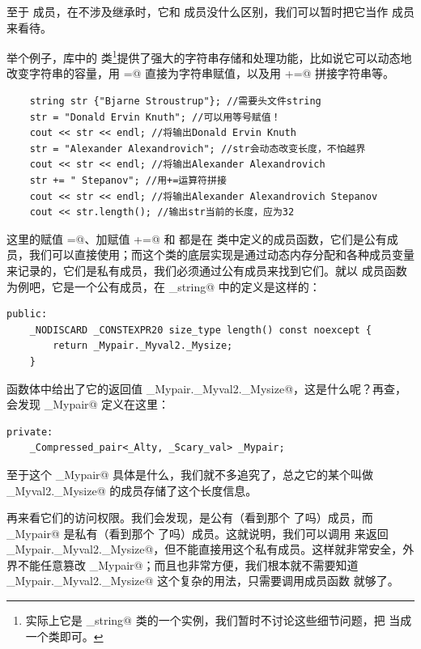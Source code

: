 至于 \lstinline@protected@ 成员，在不涉及继承时，它和 \lstinline@private@ 成员没什么区别，我们可以暂时把它当作 \lstinline@private@ 成员来看待。\par
举个例子，\lstinline@string@ 库中的 \lstinline@string@ 类\footnote{实际上它是 \lstinline@basic_string@ 类的一个实例，我们暂时不讨论这些细节问题，把 \lstinline@string@ 当成一个类即可。}提供了强大的字符串存储和处理功能，比如说它可以动态地改变字符串的容量，用 \lstinline@=@ 直接为字符串赋值，以及用 \lstinline@+=@ 拼接字符串等。
\begin{lstlisting}
    string str {"Bjarne Stroustrup"}; //需要头文件string
    str = "Donald Ervin Knuth"; //可以用等号赋值！
    cout << str << endl; //将输出Donald Ervin Knuth
    str = "Alexander Alexandrovich"; //str会动态改变长度，不怕越界
    cout << str << endl; //将输出Alexander Alexandrovich
    str += " Stepanov"; //用+=运算符拼接
    cout << str << endl; //将输出Alexander Alexandrovich Stepanov
    cout << str.length(); //输出str当前的长度，应为32
\end{lstlisting}\par
这里的赋值 \lstinline@=@、加赋值 \lstinline@+=@ 和 \lstinline@length@ 都是在 \lstinline@string@ 类中定义的成员函数，它们是公有成员，我们可以直接使用；而这个类的底层实现是通过动态内存分配和各种成员变量来记录的，它们是私有成员，我们必须通过公有成员来找到它们。就以 \lstinline@length@ 成员函数为例吧，它是一个公有成员，在 \lstinline@basic_string@ 中的定义是这样的：
\begin{lstlisting}
public:
    _NODISCARD _CONSTEXPR20 size_type length() const noexcept {
        return _Mypair._Myval2._Mysize;
    }
\end{lstlisting}
函数体中给出了它的返回值 \lstinline@_Mypair._Myval2._Mysize@，这是什么呢？再查，会发现 \lstinline@_Mypair@ 定义在这里：
\begin{lstlisting}
private:
    _Compressed_pair<_Alty, _Scary_val> _Mypair;
\end{lstlisting}
至于这个 \lstinline@_Mypair@ 具体是什么，我们就不多追究了，总之它的某个叫做 \lstinline@_Myval2._Mysize@ 的成员存储了这个长度信息。\par
再来看它们的访问权限。我们会发现，\lstinline@length@ 是公有（看到那个 \lstinline@public@ 了吗）成员，而 \lstinline@_Mypair@ 是私有（看到那个 \lstinline@private@ 了吗）成员。这就说明，我们可以调用 \lstinline@length@ 来返回 \lstinline@_Mypair._Myval2._Mysize@，但不能直接用这个私有成员。这样就非常安全，外界不能任意篡改 \lstinline@_Mypair@；而且也非常方便，我们根本就不需要知道 \lstinline@_Mypair._Myval2._Mysize@ 这个复杂的用法，只需要调用成员函数 \lstinline@length@ 就够了。\par
